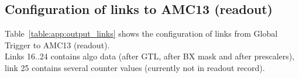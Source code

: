 \subsection{Configuration of links to AMC13 (readout)}\label{sec:app:app_c}



Table~\ref{table:app:output_links} shows the configuration of links from Global Trigger to AMC13 (readout).\\
Links 16..24 contains algo data (after GTL, after BX mask and after prescalers), link 25 contains several counter values (currently not in readout record).

